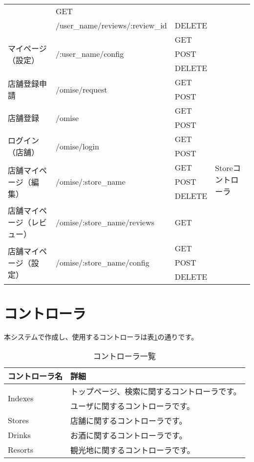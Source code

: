 \documentclass[a4j,titlepage]{jarticle}
\begin{document}
\begin{table}[!htbp]
\begin{center}
\begin{tabular}{|l|l|l|p{4cm}|}
& GET & \\\cline{2-3}
 & /user\_name/reviews/:review\_id & DELETE & \\\cline{1-3}
\multirow{3}{*}{マイページ（設定）} & \multirow{3}{*}{/:user\_name/config}
& GET & \\\cline{3-3}
 & & POST & \\\cline{3-3}
 & & DELETE & \\\hline
 \multirow{2}{*}{店舗登録申請} & \multirow{2}{*}{/omise/request}
 & GET & \multirow{13}{*}{Storeコントローラ} \\\cline{3-3}
  & & POST &\\\cline{1-3}
 \multirow{2}{*}{店舗登録} & \multirow{2}{*}{/omise}
 & GET &\\\cline{3-3}
  & & POST &\\\cline{1-3}
 \multirow{2}{*}{ログイン（店舗）} & \multirow{2}{*}{/omise/login}
 & GET & \\\cline{3-3}
  & & POST & \\\cline{1-3}
\multirow{3}{*}{店舗マイページ（編集）}& \multirow{3}{*}{/omise/:store\_name}
& GET & \\\cline{3-3}
 & & POST & \\\cline{3-3}
 & & DELETE & \\\cline{1-3}
店舗マイページ（レビュー） & /omise/:store\_name/reviews
& GET & \\\cline{1-3}
\multirow{3}{*}{店舗マイページ（設定）} & \multirow{3}{*}{/omise/:store\_name/config}
& GET & \\\cline{3-3}
 & & POST & \\\cline{3-3}
 & & DELETE & \\\hline
\end{tabular}
\end{center}
\end{table}

\section{コントローラ}
本システムで作成し、使用するコントローラは表\ref{controller}の通りです。

\begin{table}[!htbp]
\caption{コントローラ一覧}
\label{controller}
\small
\begin{center}
\begin{tabular}{|l|p{5cm}|}\hline
コントローラ名 & 詳細 \\\hline\hline
\multirow{2}{*}{Indexes} & トップページ、検索に関するコントローラです。 \\\hline
Users & ユーザに関するコントローラです。 \\\hline
Stores & 店舗に関するコントローラです。 \\\hline
Drinks & お酒に関するコントローラです。 \\\hline
Resorts & 観光地に関するコントローラです。 \\\hline
\end{tabular}
\end{center}
\end{table}
\end{document}
